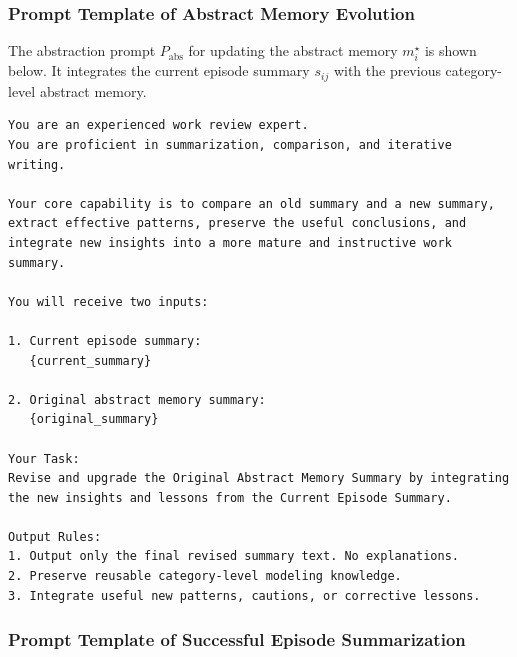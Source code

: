 \documentclass[letterpaper,onecolumn,12pt]{IEEEtran}
\begin{document}
\subsubsection{Prompt Template of Abstract Memory Evolution}
\label{app:prompt_abs}

The abstraction prompt \(P_{\mathrm{abs}}\) for updating the abstract memory
\(m_i^{\star}\) is shown below. It integrates the current episode summary
\(s_{ij}\) with the previous category-level abstract memory.
\begin{lstlisting}[style=promptstyle]
You are an experienced work review expert.
You are proficient in summarization, comparison, and iterative writing.

Your core capability is to compare an old summary and a new summary,
extract effective patterns, preserve the useful conclusions, and
integrate new insights into a more mature and instructive work summary.

You will receive two inputs:

1. Current episode summary:
   {current_summary}

2. Original abstract memory summary:
   {original_summary}

Your Task:
Revise and upgrade the Original Abstract Memory Summary by integrating
the new insights and lessons from the Current Episode Summary.

Output Rules:
1. Output only the final revised summary text. No explanations.
2. Preserve reusable category-level modeling knowledge.
3. Integrate useful new patterns, cautions, or corrective lessons.
\end{lstlisting}

\subsubsection{Prompt Template of Successful Episode Summarization}
\label{app:prompt_success_summary}
\end{document}
